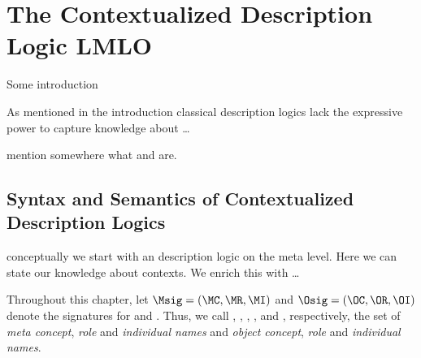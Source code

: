 \chapter{The Contextualized Description Logic LMLO}
\label{cha:context-dls}



Some introduction

As mentioned in the introduction classical description logics lack the expressive power to capture
knowledge about \ldots

mention somewhere what \LM and \LO are.



\section{Syntax and Semantics of Contextualized Description Logics}
\label{sec:syn-seman-cdl}

conceptually we start with an description logic \LM on the meta level. Here we can state our
knowledge about contexts. We enrich this with \ldots 



Throughout this chapter, let $\Msig = (\MC, \MR, \MI)$ and $\Osig = (\OC, \OR, \OI)$ denote the
signatures for \LM and \LO. Thus, we call \MC, \MR, \MI, \OC, \OR and \OI, respectively, the set of
\emph{meta concept}, \emph{role} and \emph{individual names} and \emph{object concept}, \emph{role}
and \emph{individual names}.

